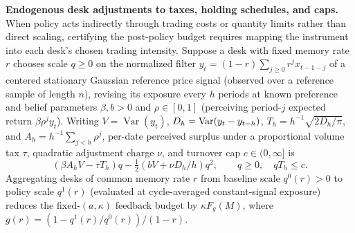 \documentclass[12pt]{article}
\theoremstyle{definition}
\theoremstyle{remark}
\begin{document}
\textbf{Endogenous desk adjustments to taxes, holding schedules, and caps.} When policy acts indirectly through trading costs or quantity limits rather than direct scaling, certifying the post-policy budget requires mapping the instrument into each desk's chosen trading intensity. Suppose a desk with fixed memory rate $r$ chooses scale $q \ge 0$ on the normalized filter $y_t=(1-r)\sum_{j\ge0}r^j x_{t-1-j}$ of a centered stationary Gaussian reference price signal (observed over a reference sample of length $n$), revising its exposure every $h$ periods at known preference and belief parameters $\beta, b > 0$ and $\rho \in [0, 1]$ (perceiving period-$j$ expected return $\beta \rho^j y_t$). Writing $V=\operatorname{Var}(y_t)$, $D_h=\mathrm{Var}(y_t-y_{t-h})$, $T_h=h^{-1}\sqrt{2D_h/\pi}$, and $A_h=h^{-1}\sum_{j<h}\rho^j$, per-date perceived surplus under a proportional volume tax $\tau$, quadratic adjustment charge $\nu$, and turnover cap $c \in (0, \infty]$ is
\[
 (\beta A_h V-\tau T_h)q-\tfrac12(bV+\nu D_h/h)q^2,
 \qquad q\ge0,\quad qT_h\le c .
\]
Aggregating desks of common memory rate $r$ from baseline scale $q^0(r)>0$ to policy scale $q^1(r)$ (evaluated at cycle-averaged constant-signal exposure) reduces the fixed-$(a,\kappa)$ feedback budget by $\kappa F_g(M)$, where $g(r)=(1-q^1(r)/q^0(r))/(1-r)$.
\end{document}
